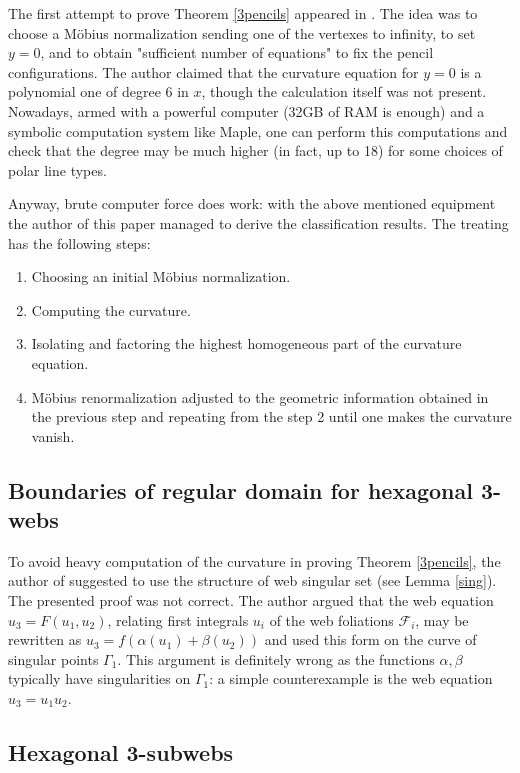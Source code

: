 \documentclass[11pt,a4paper]{article}
\begin{document}
The first attempt to prove Theorem \ref{3pencils} appeared in \cite{E-89}. The idea was to  choose a M\"obius  normalization sending one of the vertexes to infinity, to set $y=0$, and to obtain "sufficient number of equations"  to fix the pencil configurations. The author claimed that the curvature equation for $y=0$ is a polynomial one of degree 6 in $x$, though  the calculation itself was not present. Nowadays, armed with a  powerful computer (32GB of RAM is enough) and a symbolic computation system like Maple, one can perform this computations and check that the degree may be much higher (in fact, up to 18) for some choices of polar line types.    

Anyway, brute computer force does work: with the above mentioned equipment the author of this paper managed to derive the classification results.  
The treating  has the following steps:
\begin{enumerate}
\item Choosing an initial M\"obius normalization.
\item Computing the curvature.
\item Isolating and factoring the highest homogeneous part of the curvature equation.
\item  M\"obius renormalization adjusted to the geometric information obtained in the previous step and repeating from the step 2 until one makes the curvature vanish. 
\end{enumerate}

\subsection{Boundaries of regular domain for hexagonal 3-webs}

To avoid heavy computation of the curvature in proving Theorem \ref{3pencils}, the author of \cite{S-05} suggested to use the structure of  web singular set (see Lemma \ref{sing}). The presented proof was not correct.  The author argued that the web equation $u_3=F(u_1,u_2)$, relating  first integrals $u_i$  of the web foliations $\mathcal{F}_i$, may be rewritten as  $u_3=f(\alpha(u_1)+\beta(u_2))$ and used this form on the curve of singular points $\Gamma_1$.  This argument is definitely wrong as the functions $\alpha,\beta$ typically have singularities on $\Gamma_1$:  a simple  counterexample is the web equation $u_3=u_1u_2$. 


\subsection{Hexagonal 3-subwebs}
\end{document}
